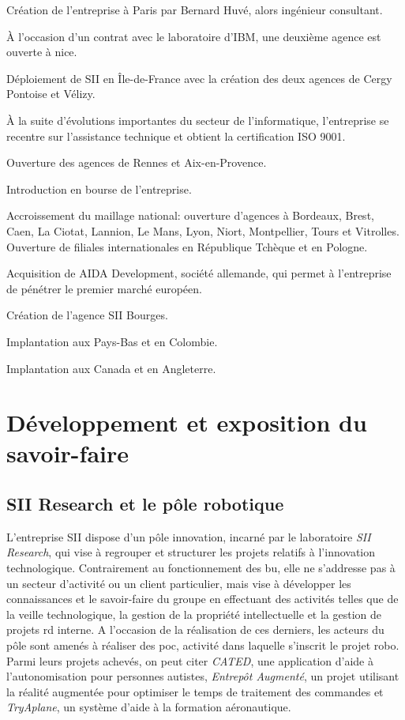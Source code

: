 {{			\begin{description}
			{
				\item[1979:] Création de l'entreprise à Paris par Bernard Huvé, alors ingénieur consultant.
				\item[1984:] À l'occasion d'un contrat avec le laboratoire d'IBM, une deuxième agence est ouverte à nice.
				\item[1987-1989:] Déploiement de SII en Île-de-France avec la création des deux agences de Cergy Pontoise et Vélizy.
				\item[1992:] À la suite d'évolutions importantes du secteur de l'informatique, l'entreprise se recentre sur l'assistance technique et obtient la certification ISO 9001.
				\item[1997:] Ouverture des agences de Rennes et Aix-en-Provence.
				\item[1999:] Introduction en bourse de l'entreprise.
				\item[2000-2007:] Accroissement du maillage national: ouverture d'agences à Bordeaux, Brest, Caen, La Ciotat, Lannion, Le Mans, Lyon, Niort, Montpellier, Tours et Vitrolles. Ouverture de filiales internationales en République Tchèque et en Pologne.
				\item[2010:] Acquisition de AIDA Development, société allemande, qui permet à l'entreprise de pénétrer le premier marché européen.
				\item[Août 2010:] Création de l'agence SII Bourges.
				\item[2015:] Implantation aux Pays-Bas et en Colombie.
				\item[2016:] Implantation aux Canada et en Angleterre.
			}
			\end{description}
	}
	\section{Développement et exposition du savoir-faire}
	
		\subsection{SII Research et le pôle robotique}
			
			\par
			{
				L'entreprise SII dispose d'un pôle innovation, incarné par le laboratoire \emph{SII Research}, qui vise à regrouper et structurer les projets relatifs à l'innovation technologique. Contrairement au fonctionnement des \gls{bu}, elle ne s'addresse pas à un secteur d'activité ou un client particulier, mais vise à développer les connaissances et le savoir-faire du groupe en effectuant des activités telles que de la veille technologique, la gestion de la propriété intellectuelle et la gestion de projets \gls{rd} interne. A l'occasion de la réalisation de ces derniers, les acteurs du pôle sont amenés à réaliser des \gls{poc}, activité dans laquelle s'inscrit le projet \gls{robo}. Parmi leurs projets achevés, on peut citer \emph{CATED}, une application d'aide à l'autonomisation pour personnes autistes, \emph{Entrepôt Augmenté}, un projet utilisant la réalité augmentée pour optimiser le temps de traitement des commandes et \emph{TryAplane}, un système d'aide à la formation aéronautique.
				
}}
